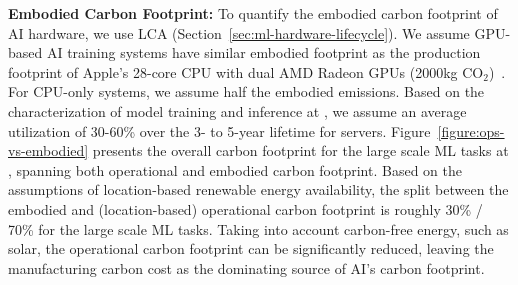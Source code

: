 \textbf{Embodied Carbon Footprint:} To quantify the embodied carbon footprint of AI hardware, we use LCA (Section~\ref{sec:ml-hardware-lifecycle}). 
We assume GPU-based AI training systems have similar embodied footprint
as the production footprint of Apple's 28-core CPU with dual AMD Radeon GPUs (2000kg CO$_2$)~\cite{appleMacProMax}.
For CPU-only systems, we assume half the embodied emissions.
Based on the characterization of model training and inference at \fb, we assume an average utilization of 30-60\% over the 3- to 5-year lifetime for servers.
Figure~\ref{figure:ops-vs-embodied} presents the overall carbon footprint for the large scale ML tasks at \fb, spanning both operational and embodied carbon footprint. Based on the assumptions of location-based renewable energy availability, the split between the embodied and (location-based) operational carbon footprint is roughly 30\% / 70\% for the large scale ML tasks. Taking into account carbon-free energy, such as solar, the operational carbon footprint can be significantly reduced, leaving the manufacturing carbon cost as the dominating source of AI's carbon footprint.





